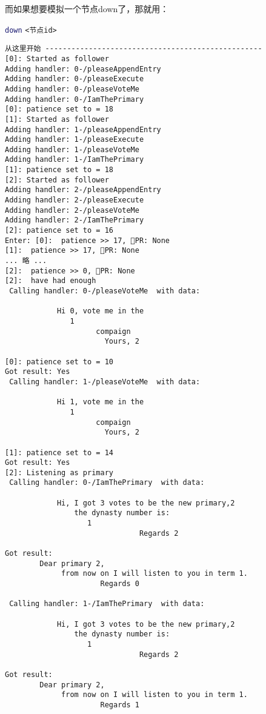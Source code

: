\documentclass[dvipsnames]{ctexart}
\newcommand{\mycola}{MidnightBlue}
\newcommand{\mycolb}{Mahogany}
\newcommand{\cola}[1]{\textcolor{\mycola}{#1}}
\newcommand{\colb}[1]{\textcolor{\mycolb}{#1}}
\begin{document}
而如果想要模拟一个节点down了，那就用：
\begin{center}
  \cola{\texttt{down}} \colb{\texttt{<节点id>}}
\end{center}

 \begin{tcolorbox}[breakable,title=Raft共识模拟的命令行输出（部分没啥用的输出被省略了）]
  \begin{verbatim}
从这里开始 --------------------------------------------------
[0]: Started as follower
Adding handler: 0-/pleaseAppendEntry
Adding handler: 0-/pleaseExecute
Adding handler: 0-/pleaseVoteMe
Adding handler: 0-/IamThePrimary
[0]: patience set to = 18
[1]: Started as follower
Adding handler: 1-/pleaseAppendEntry
Adding handler: 1-/pleaseExecute
Adding handler: 1-/pleaseVoteMe
Adding handler: 1-/IamThePrimary
[1]: patience set to = 18
[2]: Started as follower
Adding handler: 2-/pleaseAppendEntry
Adding handler: 2-/pleaseExecute
Adding handler: 2-/pleaseVoteMe
Adding handler: 2-/IamThePrimary
[2]: patience set to = 16
Enter: [0]:  patience >> 17, 🐢PR: None
[1]:  patience >> 17, 🐢PR: None
... 略 ... 
[2]:  patience >> 0, 🐢PR: None
[2]:  have had enough
 Calling handler: 0-/pleaseVoteMe  with data:
  
            Hi 0, vote me in the
               1
                     compaign
                       Yours, 2
             
[0]: patience set to = 10
Got result: Yes 
 Calling handler: 1-/pleaseVoteMe  with data:
  
            Hi 1, vote me in the
               1
                     compaign
                       Yours, 2
             
[1]: patience set to = 14
Got result: Yes 
[2]: Listening as primary
 Calling handler: 0-/IamThePrimary  with data:
  
            Hi, I got 3 votes to be the new primary,2
                the dynasty number is:
                   1
                               Regards 2
             
Got result: 
        Dear primary 2,
             from now on I will listen to you in term 1.
                      Regards 0
         
 Calling handler: 1-/IamThePrimary  with data:
  
            Hi, I got 3 votes to be the new primary,2
                the dynasty number is:
                   1
                               Regards 2
             
Got result: 
        Dear primary 2,
             from now on I will listen to you in term 1.
                      Regards 1
         

\end{verbatim}
\end{tcolorbox}
\end{document}
